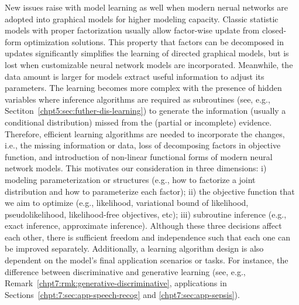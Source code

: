 New issues raise with model learning as well when modern nerual networks are adopted into graphical models for higher modeling capacity. Classic statistic models with proper factorization usually allow factor-wise update from closed-form optimization solutions. This property that factors can be decomposed in updates significantly simplifies the learning of directed graphical models, but is lost when customizable neural network models are incorporated. Meanwhile, the data amount is larger for models extract useful information to adjust its parameters. The learning becomes more complex with the presence of hidden variables where inference algorithms are required as subroutines (see, e.g., Sectiton~\ref{chpt5:sec:futher-dis-learning}) to generate the information (usually a conditional distribution) missed from the (partial or incomplete) evidence.
Therefore, efficient learning algorithms are needed to incorporate the changes, i.e., the missing information or data, loss of decomposing factors in objective function, and introduction of non-linear functional forms of modern neural network models. This motivates our consideration in three dimensions: i) modeling parameterization or structures (e.g., how to factorize a joint distribution and how to parameterize each factor); ii) the objective function that we aim to optimize (e.g., likelihood, variational bound of likelihood, pseudolikelihood, likelihood-free objectives, etc); iii) subroutine inference (e.g., exact inference, approximate inference). Although these three decisions affect each other, there is sufficient freedom and independence such that each one can be improved separately. Additionally, a learning algorithm design is also dependent on the model's final application scenarios or tasks. For instance, the difference between discriminative and generative learning (see, e.g., Remark~\ref{chpt7:rmk:generative-discriminative}, applications in Sections~\ref{chpt:7:sec:app-speech-recog} and \ref{chpt7:sec:app-sepsis}).



